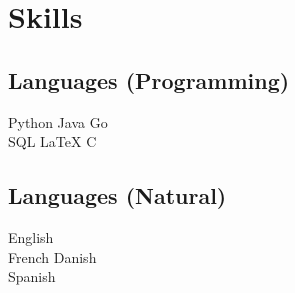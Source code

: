\documentclass[letterpaper]{deedy-resume} %
\begin{document}
\begin{minipage}[t]{0.33\textwidth}
\sectionspace %

%
%
%
%
%
%
%
%


\section{Skills}

\subsection{Languages (Programming)}
Python \textbullet{} Java \textbullet{} Go \\
SQL \textbullet{} LaTeX \textbullet{} C \\
\subsection{Languages (Natural)}
English\\
French \textbullet{} Danish\\
Spanish


\sectionspace %


\end{minipage} %
\end{document}
